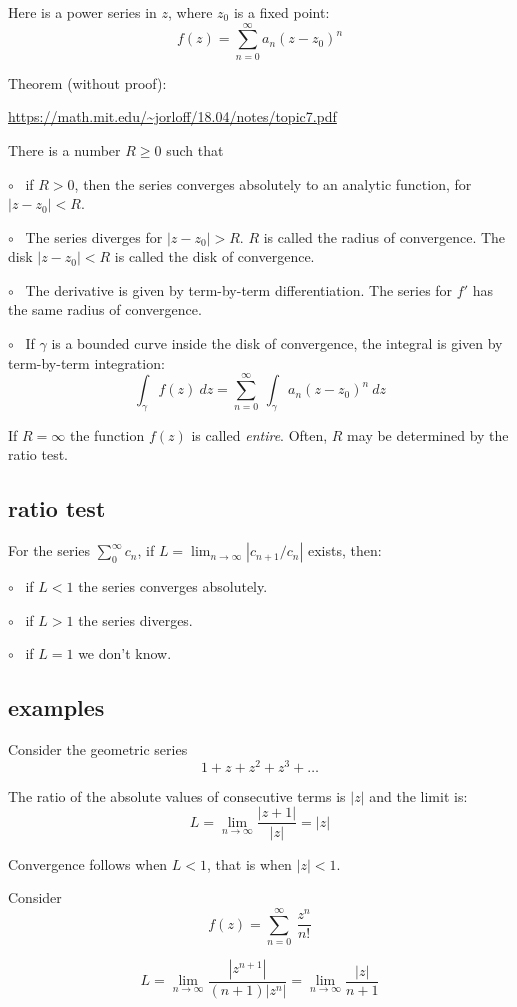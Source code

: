 \documentclass[11pt, oneside]{article}
\begin{document}
Here is a power series in $z$, where $z_0$ is a fixed point:
\[ f(z) = \sum_{n=0}^{\infty} a_n(z - z_0)^n \]

Theorem (without proof):

\url{https://math.mit.edu/~jorloff/18.04/notes/topic7.pdf}

There is a number $R \ge 0$ such that

$\circ$ \ if $R > 0$, then the series converges absolutely to an analytic function, for $|z - z_0| < R$.

$\circ$ \ The series diverges for $|z - z_0| > R$. $R$ is called the radius of convergence. The disk $|z - z_0| < R$ is called the disk of convergence.

$\circ$ \ The derivative is given by term-by-term differentiation.  The series for $f'$ has the same radius of convergence.

$\circ$ \ If $\gamma$ is a bounded curve inside the disk of convergence, the integral is given by term-by-term integration:
\[ \int_{\gamma} f(z) \ dz = \sum_{n=0}^{\infty} \ \int_{\gamma} a_n(z - z_0)^n \ dz \]

If $R = \infty$ the function $f(z)$ is called \emph{entire}.  Often, $R$ may be determined by the ratio test.

\subsection*{ratio test}
For the series $\sum_0^{\infty} c_n$, if $L = \lim_{n \rightarrow \infty} |c_{n+1}/c_n|$ exists, then:

$\circ$ \ if $L < 1$ the series converges absolutely.

$\circ$ \ if $L > 1$ the series diverges.

$\circ$ \ if $L = 1$ we don't know.

\subsection*{examples}

Consider the geometric series
\[ 1 + z + z^2 + z^3 + \dots \]

The ratio of the absolute values of consecutive terms is $|z|$ and the limit is:
\[ L = \lim_{n \rightarrow \infty} \frac{|z+1|}{|z|} = |z| \]

Convergence follows when $L < 1$, that is when $|z| < 1$.

Consider
\[ f(z) = \sum_{n=0}^{\infty} \ \frac{z^n}{n!} \]

\[ L =  \lim_{n \rightarrow \infty} \frac{|z^{n+1}|}{(n+1) |z^n|} =  \lim_{n \rightarrow \infty} \frac{|z|}{n+1} \]
\end{document}
